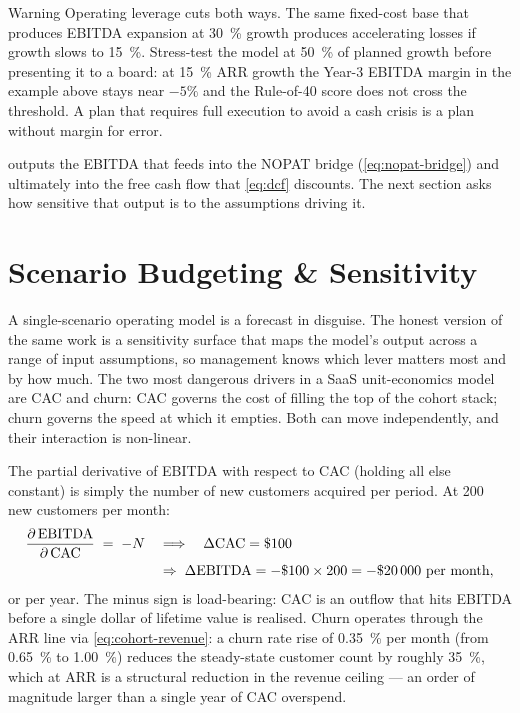 \begin{admonition}{Warning}
Operating leverage cuts both ways. The same fixed-cost base that produces EBITDA expansion at
\qty{30}{\percent} growth produces accelerating losses if growth slows to \qty{15}{\percent}.
Stress-test the model at \qty{50}{\percent} of planned growth before presenting it to a board:
at \qty{15}{\percent} ARR growth the Year-3 EBITDA margin in the example above stays near
\(-5\%\) and the Rule-of-40 score does not cross the threshold. A plan that requires full
execution to avoid a cash crisis is a plan without margin for error.
\end{admonition}

 outputs the EBITDA that feeds into the NOPAT bridge (\cref{eq:nopat-bridge})
and ultimately into the free cash flow that \cref{eq:dcf} discounts. The next section asks how
sensitive that output is to the assumptions driving it.


\section{Scenario Budgeting \& Sensitivity}\label{sec:scenario-budget}

A single-scenario operating model is a forecast in disguise. The honest version of the same
work is a sensitivity surface that maps the model's output across a range of input assumptions,
so management knows which lever matters most and by how much. The two most dangerous drivers in
a SaaS unit-economics model are CAC and churn: CAC governs the cost of filling the top of the
cohort stack; churn governs the speed at which it empties. Both can move independently, and
their interaction is non-linear.

The partial derivative of EBITDA with respect to CAC (holding all else constant) is simply the
number of new customers acquired per period. At \num{200} new customers per month:
\begin{equation}\label{eq:sensitivity}
  \begin{aligned}
    \frac{\partial\,\mathrm{EBITDA}}{\partial\,\mathrm{CAC}} \;=\; -N
    \quad&\Longrightarrow\quad \Delta\mathrm{CAC}=\$\num{100} \\
    &\Rightarrow\; \Delta\mathrm{EBITDA} = -\$\num{100}\times 200 = -\$\num{20000}\text{ per month},
  \end{aligned}
\end{equation}
or  per year. The minus sign is load-bearing: CAC is an outflow that hits EBITDA
before a single dollar of lifetime value is realised. Churn operates through the ARR line via
\cref{eq:cohort-revenue}: a churn rate rise of \qty{0.35}{\percent} per month (from
\qty{0.65}{\percent} to \qty{1.00}{\percent}) reduces the steady-state customer count by roughly
\qty{35}{\percent}, which at  ARR is a structural  reduction in the
revenue ceiling --- an order of magnitude larger than a single year of CAC overspend.

